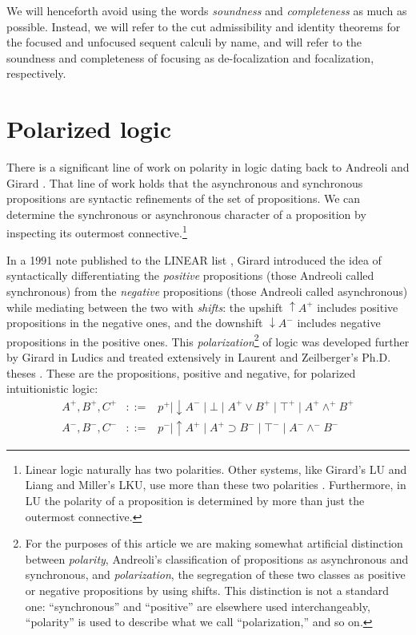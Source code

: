 \documentclass[acmtocl]{robtrans}\pdfoutput=1
\begin{document}
We will henceforth avoid using 
the words {\it soundness} and {\it completeness} as much as possible. 
Instead, we will refer
to the cut admissibility and identity theorems 
for the focused and unfocused sequent calculi by name, and will refer
to the soundness and completeness of focusing as de-focalization 
and focalization, respectively.

\section{Polarized logic}
\label{sec:logic}

There is a significant line of work on polarity in logic dating back
to Andreoli  and Girard
. That line of work holds that 
the asynchronous and
synchronous propositions are syntactic refinements of the set of
propositions. We can determine the synchronous or asynchronous
character of a proposition by inspecting its outermost
connective.\footnote{Linear logic naturally has two polarities. Other
  systems, like Girard's LU and Liang and Miller's LKU, use more than
  these two polarities
  \cite{girard93unity,liang11focused}. Furthermore, in LU the polarity
  of a proposition is determined by more than just the outermost
  connective.}

In a 1991 note published to the LINEAR list \cite{girard91sex}, Girard
introduced the idea of syntactically differentiating the {\it
  positive} propositions (those Andreoli called synchronous) from the
{\it negative} propositions (those Andreoli called asynchronous) while
mediating between the two with {\it shifts}: the upshift
${\uparrow}A^+$ includes positive propositions in the negative ones,
and the downshift ${\downarrow}A^-$ includes negative propositions in
the positive ones. This {\it polarization}\footnote{For the purposes
  of this article we are making somewhat artificial distinction
  between {\it polarity}, Andreoli's classification of propositions as
  asynchronous and synchronous, and {\it polarization}, the
  segregation of these two classes as positive or negative
  propositions by using shifts. This distinction is not a standard
  one: ``synchronous'' and ``positive'' are elsewhere used
  interchangeably, ``polarity'' is used to describe what we call
  ``polarization,'' and so on.} of logic was developed further by
Girard in Ludics \cite{girard01locus} and treated extensively in
Laurent and Zeilberger's Ph.D. theses
\cite{laurent02etude,zeilberger09logical}.
These are the propositions, positive and negative, for polarized
intuitionistic logic:
\[
\begin{array}{rcl}
A^+, B^+, C^+ & ::= & p^+ \mid {\downarrow} A^- \mid \bot \mid A^+ \vee B^+
  \mid \top^+ \mid A^+ \wedge^+ B^+
\\
A^-, B^-, C^- & ::= & p^- \mid {\uparrow} A^+ \mid A^+ \supset B^-
  \mid \top^- \mid A^- \wedge^- B^-
\end{array}
\]
\end{document}
